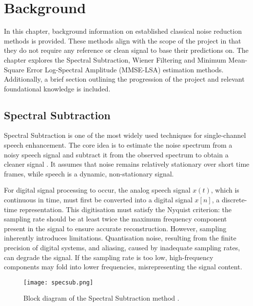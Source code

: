 \graphicspath{{content/chapters/2_background/figures/}}
\chapter{Background}
\label{chp:background}

In this chapter, background information on established classical noise reduction methods is provided. These methods align with the scope of the project in that they do not require any reference or clean signal to base their predictions on. The chapter explores the Spectral Subtraction, Wiener Filtering  and Minimum Mean-Square Error Log-Spectral Amplitude (MMSE-LSA) estimation methods. Additionally, a brief section outlining the progression of the project and relevant foundational knowledge is included.

\section{Spectral Subtraction}
\label{sec:spectral_subtraction}

Spectral Subtraction is one of the most widely used techniques for single-channel speech enhancement. The core idea is to estimate the noise spectrum from a noisy speech signal and subtract it from the observed spectrum to obtain a cleaner signal \cite{loizou2013speech}. It assumes that noise remains relatively stationary over short time frames, while speech is a dynamic, non-stationary signal.

For digital signal processing to occur, the analog speech signal \(x(t)\), which is continuous in time, must first be converted into a digital signal \(x[n]\), a discrete-time representation. This digitisation must satisfy the Nyquist criterion: the sampling rate should be at least twice the maximum frequency component present in the signal to ensure accurate reconstruction. However, sampling inherently introduces limitations. Quantisation noise, resulting from the finite precision of digital systems, and aliasing, caused by inadequate sampling rates, can degrade the signal. If the sampling rate is too low, high-frequency components may fold into lower frequencies, misrepresenting the signal content.

\begin{figure}[h]
    \centering
    \texttt{[image: specsub.png]}
    \caption{\label{fig:SSBlock} Block diagram of the Spectral Subtraction method \cite{dubey2016evaluation}.}
\end{figure}

